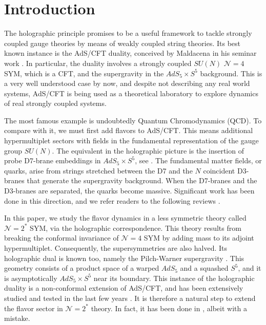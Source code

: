 \section{Introduction}

The holographic principle promises to be a useful framework to tackle strongly coupled gauge theories by means of weakly coupled string theories. Its best known instance is the AdS/CFT duality, conceived by Maldacena in his seminar work \cite{Maldacena:1997re}. In particular, the duality involves a strongly coupled $SU(N)$ $\mathcal{N}=4$ SYM, which is a CFT, and the supergravity in the $AdS_5 \times S^5$ background. This is a very well understood case by now, and despite not describing any real world systems, AdS/CFT is being used as a theoretical laboratory to explore dynamics of real strongly coupled systems.

The most famous example is undoubtedly Quantum Chromodynamics (QCD). To compare with it, we must first add flavors to AdS/CFT. This means additional hypermultiplet sectors with fields in the fundamental representation of the gauge group $SU(N)$. The equivalent in the holographic picture is the insertion of probe D7-brane embeddings in $AdS_5 \times S^5$, see \cite{Karch:2002sh}. The fundamental matter fields, or quarks, arise from strings stretched between the D7 and the $N$ coincident D3-branes that generate the supergravity background. When the D7-branes and the D3-branes are separated, the quarks become massive. Significant work has been done in this direction, and we refer readers to the following reviews \cite{CasalderreySolana:2011us, Erdmenger:2007cm}.

In this paper, we study the flavor dynamics in a less symmetric theory called $\mathcal{N}=2^*$ SYM, via the holographic correspondence. This theory results from breaking the conformal invariance of $\mathcal{N}=4$ SYM by adding mass to its adjoint hypermultiplet. Consequently, the supersymmetries are also halved. Its holographic dual is known too, namely the Pilch-Warner supergravity \cite{Pilch:2000ue, Pilch:2003jg}. This geometry consists of a product space of a warped $AdS_5$ and a squashed $S^5$, and it is asymptotically $AdS_5 \times S^5$ near its boundary. This instance of the holographic duality is a non-conformal extension of AdS/CFT, and has been extensively studied and tested in the last few years \cite{Buchel:2013id, Chen-Lin:2015xlh, Chen-Lin:2017pay, Russo:2019lgq}. It is therefore a natural step to extend the flavor sector in $\mathcal{N}=2^*$ theory. In fact, it has been done in \cite{Albash:2011nw}, albeit with a mistake.

